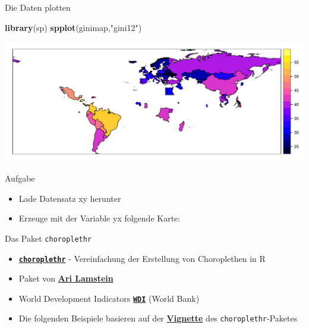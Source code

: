 \documentclass[ignorenonframetext,]{beamer}
\newenvironment{Shaded}{\begin{snugshade}}{\end{snugshade}}
\newcommand{\KeywordTok}[1]{\textcolor[rgb]{0.13,0.29,0.53}{\textbf{#1}}}
\newcommand{\StringTok}[1]{\textcolor[rgb]{0.31,0.60,0.02}{#1}}
\newcommand{\NormalTok}[1]{#1}
\providecommand{\tightlist}{%
  \setlength{\itemsep}{0pt}\setlength{\parskip}{0pt}}
\begin{document}
\begin{frame}[fragile]{Die Daten plotten}

\begin{Shaded}
\begin{Highlighting}[]
\KeywordTok{library}\NormalTok{(sp)}
\KeywordTok{spplot}\NormalTok{(ginimap,}\StringTok{"gini12"}\NormalTok{)}
\end{Highlighting}
\end{Shaded}

\includegraphics{Choroplethen_files/figure-beamer/unnamed-chunk-13-1.pdf}

\end{frame}

\begin{frame}{Aufgabe}

\begin{itemize}
\tightlist
\item
  Lade Datensatz xy herunter
\item
  Erzeuge mit der Variable yx folgende Karte:
\end{itemize}

\end{frame}

\begin{frame}[fragile]{Das Paket \texttt{choroplethr}}

\begin{itemize}
\item
  \href{https://cran.r-project.org/web/packages/choroplethr/index.html}{\textbf{\texttt{choroplethr}}}
  - Vereinfachung der Erstellung von Choroplethen in R
\item
  Paket von \href{http://www.arilamstein.com/}{\textbf{Ari Lamstein}}
\item
  World Development Indicators
  \href{https://cran.r-project.org/web/packages/WDI/index.html}{\textbf{\texttt{WDI}}}
  (World Bank)
\item
  Die folgenden Beispiele basieren auf der
  \href{https://cran.r-project.org/web/packages/choroplethr/index.html}{\textbf{Vignette}}
  des \texttt{choroplethr}-Paketes
\end{itemize}

\end{frame}
\end{document}
